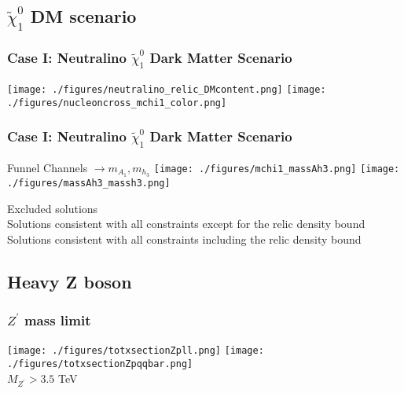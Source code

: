 \documentclass[hyperref={bookmarks=false},aspectratio=169]{beamer}
\newcommand*{\graybullet}{\textcolor{gray}{\textbullet}}
\newcommand*{\bluebullet}{\textcolor{blue}{\textbullet}}
\newcommand*{\redbullet}{\textcolor{red}{\textbullet}}
\begin{document}
\subsection{$\widetilde{\chi}_1^0$ DM scenario}


\begin{frame}
\frametitle{Case I: Neutralino $\widetilde{\chi}_1^0$ Dark Matter Scenario}
\centering
\texttt{[image: ./figures/neutralino\_relic\_DMcontent.png]} 
\pause
\texttt{[image: ./figures/nucleoncross\_mchi1\_color.png]} \\
\end{frame}





\begin{frame}
\frametitle{Case I: Neutralino $\widetilde{\chi}_1^0$ Dark Matter Scenario}
\centering
Funnel Channels $\rightarrow m_{A_1}, m_{h_3}$
\texttt{[image: ./figures/mchi1\_massAh3.png]} 
\texttt{[image: ./figures/massAh3\_massh3.png]}

\graybullet Excluded solutions \\
\bluebullet Solutions consistent with all constraints except for the relic density bound \\
\redbullet Solutions consistent with all constraints including the relic density bound

\end{frame}





\subsection{Heavy Z boson}

\begin{frame}
\frametitle{$Z^\prime$ mass limit}
\centering
\texttt{[image: ./figures/totxsectionZpll.png]} 
\pause
\texttt{[image: ./figures/totxsectionZpqqbar.png]} \\
\pause
$M_{Z^\prime} > 3.5$ TeV
\end{frame}
\end{document}

